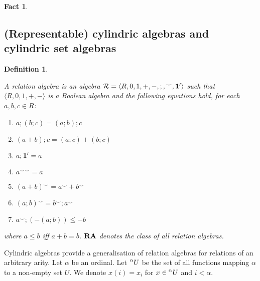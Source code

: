 \documentclass[a4paper]{article}
\theoremstyle{defin}
\newtheorem{defin}{Definition}
\theoremstyle{theorem}
\theoremstyle{prop}
\theoremstyle{lemma}
\theoremstyle{fact}
\newtheorem{fact}{Fact}
\theoremstyle{ex}
\theoremstyle{col}
\begin{document}
\begin{fact}
\end{fact}

\subsection{(Representable) cylindric algebras and cylindric set algebras}

\begin{defin}
  $ $

    A relation algebra is an algebra $\mathcal{R} = \langle R, 0, 1, +, -, ;, {}^{\smile}, {\bf 1 }' \rangle$ such that $\langle R, 0, 1, +, - \rangle$ is a Boolean algebra and the following
    equations hold, for each $a, b, c \in R$:
    \begin{enumerate}
      \item $a ; (b ; c) = (a ; b) ; c$
      \item $(a + b) ; c = (a ; c) + (b ; c)$
      \item $a ; {\bf 1}' = a$
      \item $a^{\smile \smile} = a$
      \item $(a + b)^{\smile} = a^{\smile} + b^{\smile}$
      \item $(a ; b)^{\smile} = b^{\smile} ; a^{\smile}$
      \item $a^{\smile} ; (- (a ; b)) \leq - b$
    \end{enumerate}
    where $a \leq b$ iff $a + b = b$. ${\bf RA}$ denotes the class of all relation
    algebras.
\end{defin}

Cylindric algebras provide a generalisation of relation algebras for relations of an arbitrary arity. Let $\alpha$ be an ordinal. Let $\prescript{\alpha}{}U$ be the set of all functions mapping $\alpha$ to a non-empty set $U$. We denote $x(i) = x_i$ for
$x \in \prescript{\alpha}{}U$ and $i < \alpha$.
\end{document}
